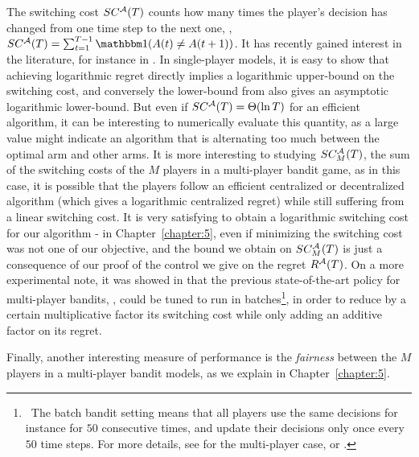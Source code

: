 The switching cost $SC^{\mathcal{A}}(T)$ counts how many times the player's decision has changed from one time step to the next one, \ie, $SC^{\cA}(T) = \sum_{t=1}^{T-1} \indic(A(t) \neq A(t+1))$.
It has recently gained interest in the literature, for instance in \cite{Koren17}.
In single-player models,
it is easy to show that achieving logarithmic regret directly implies a logarithmic upper-bound on the switching cost, and conversely the lower-bound from \cite{LaiRobbins85} also gives an asymptotic logarithmic lower-bound.
But even if $SC^{\mathcal{A}}(T) = \Theta(\ln T)$ for an efficient algorithm, it can be interesting to numerically evaluate this quantity, as a large value might indicate an algorithm that is alternating too much between the optimal arm and other arms.
%
It is more interesting to studying $SC_M^{\mathcal{A}}(T)$, the sum of the switching costs of the $M$ players in a multi-player bandit game, as in this case, it is possible that the players follow an efficient centralized or decentralized algorithm (which gives a logarithmic centralized regret) while still suffering from a linear switching cost.
It is very satisfying to obtain a logarithmic switching cost for our algorithm \MCTopM-\klUCB{} in Chapter~\ref{chapter:5}, even if minimizing the switching cost was not one of our objective, and the bound we obtain on $SC_M^{\mathcal{A}}(T)$ is just a consequence of our proof of the control we give on the regret $R^{\mathcal{A}}(T)$.
On a more experimental note, it was showed in \cite{modiDemo2016} that the previous state-of-the-art policy for multi-player bandits, \rhoRand, could be tuned to run in batches\footnote{~The batch bandit setting means that all players use the same decisions for instance for $50$ consecutive times, and update their decisions only once every $50$ time steps. For more details, see \cite{modiDemo2016} for the multi-player case, or \cite{perchet2016,gao2019batched,kolnogorov2019multi}.}, in order to reduce by a certain multiplicative factor its switching cost while only adding an additive factor on its regret.


Finally, another interesting measure of performance is the \emph{fairness} between the $M$ players in a multi-player bandit models, as we explain in Chapter~\ref{chapter:5}.


